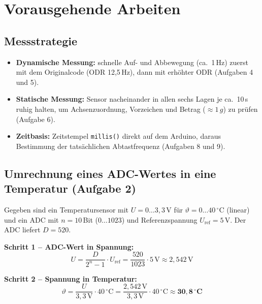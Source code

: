 \documentclass[a4paper,oneside,10pt]{article}
\begin{document}
\section{Vorausgehende Arbeiten}

\subsection{Messstrategie}

\begin{itemize}
  \item \textbf{Dynamische Messung:} schnelle Auf- und Abbewegung (ca.\ 1\,Hz) zuerst mit
        dem Originalcode (ODR 12{,}5\,Hz), dann mit erhöhter ODR (Aufgaben 4 und 5).
  \item \textbf{Statische Messung:} Sensor nacheinander in allen sechs Lagen je ca.\ 10\,s
        ruhig halten, um Achsenzuordnung, Vorzeichen und Betrag ($\approx 1\,g$) zu prüfen
        (Aufgabe 6).
  \item \textbf{Zeitbasis:} Zeitstempel \texttt{millis()} direkt auf dem Arduino, daraus
        Bestimmung der tatsächlichen Abtastfrequenz (Aufgaben 8 und 9).
\end{itemize}

\subsection{Umrechnung eines ADC-Wertes in eine Temperatur (Aufgabe 2)}

Gegeben sind ein Temperatursensor mit $U = 0 \ldots 3{,}3$\,V für
$\vartheta = 0 \ldots 40\,^\circ$C (linear) und ein ADC mit $n = 10$\,Bit
($0 \ldots 1023$) und Referenzspannung $U_\mathrm{ref} = 5$\,V. Der ADC liefert
$D = 520$.

\textbf{Schritt 1 -- ADC-Wert in Spannung:}
\begin{equation}
  U = \frac{D}{2^{n}-1}\cdot U_\mathrm{ref} = \frac{520}{1023}\cdot 5\,\mathrm{V} \approx 2{,}542\,\mathrm{V}
\end{equation}

\textbf{Schritt 2 -- Spannung in Temperatur:}
\begin{equation}
  \vartheta = \frac{U}{3{,}3\,\mathrm{V}}\cdot 40\,^\circ\mathrm{C}
            = \frac{2{,}542\,\mathrm{V}}{3{,}3\,\mathrm{V}}\cdot 40\,^\circ\mathrm{C}
            \approx \mathbf{30{,}8\,^\circ C}
\end{equation}
\end{document}
